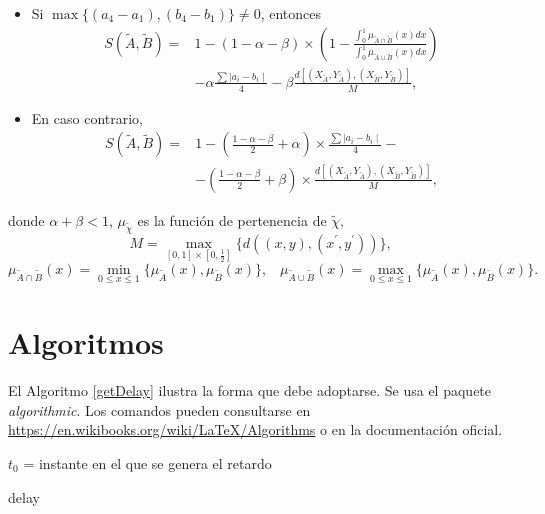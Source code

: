 \begin{itemize}
\item Si $\max \{(a_{4}-a_{1}),(b_{4}-b_{1})\}\neq 0$, entonces
\begin{align*}
S(\widetilde{A},\widetilde{B})=& 1 - ( 1 - \alpha - \beta) \times \left( 1 - \frac{\int_{0}^{1} \mu_{\widetilde{A}\cap \widetilde{B}}(x)dx} {\int_{0}^{1} \mu_{\widetilde{A}\cup \widetilde{B}}(x)dx}\right) \\
& -\alpha\frac{\sum \mid a_{i} - b_{i} \mid }{4}- \beta \frac{d[(X_{\widetilde{A} },Y_{\widetilde{A}}),(X_{\widetilde{B}} ,Y_{\widetilde{B}})]}{M},
\end{align*}

\item En caso contrario,%
\begin{align*}
S(\widetilde{A} ,\widetilde{B})=& 1- \left( \frac{1-\alpha-\beta}{2} + \alpha \right) \times
\frac{\sum \mid a_i - b_i \mid}{4} - \\
& - \left( \frac{1 - \alpha - \beta}{2} + \beta \right) \times \frac{d[(X_{\widetilde{A}},Y_{\widetilde{A}}), (X_{\widetilde{B}},Y_{\widetilde{B}})]}{M},
\end{align*}
\end{itemize}
donde $\alpha +\beta <1$, $\mu _{\widetilde{\chi }}$ es la función de pertenencia de $\widetilde{\chi}$,
\begin{equation}
M=\underset{[0,1]\times[0,\frac{1}{2}]}{\max}\{d((x,y),(x^{\prime },y^{\prime }))\}\text{,}
\end{equation}%
\begin{equation*}
\mu _{\widetilde{A}\cap \widetilde{B}}(x)=\underset{0\leq x\leq 1}{\min}%
\{\mu _{\widetilde{A}}(x),\mu _{\widetilde{B}}(x)\} ,
\;\;\; \mu _{\widetilde{A}\cup \widetilde{B}}(x)=\underset{0\leq x\leq 1}{\max}%
\{\mu _{\widetilde{A}}(x),\mu _{\widetilde{B}}(x)\}.
\end{equation*}%

\section{Algoritmos}

El Algoritmo \ref{getDelay} ilustra la forma que debe adoptarse. Se usa el paquete \textit{algorithmic}. Los comandos pueden consultarse en \url{https://en.wikibooks.org/wiki/LaTeX/Algorithms} o en la documentación oficial.

\begin{algorithm}[h]
	\begin{algorithmic}
	\REQUIRE $t_0$ = instante en el que se genera el retardo

		\ELSE
			\ELSE
			\ENDIF
		\ENDIF
	\ELSE
	\ENDIF

	\RETURN delay
	\end{algorithmic}
	\caption{$getDelay(t_0)$}
	\label{getDelay}
\end{algorithm}


